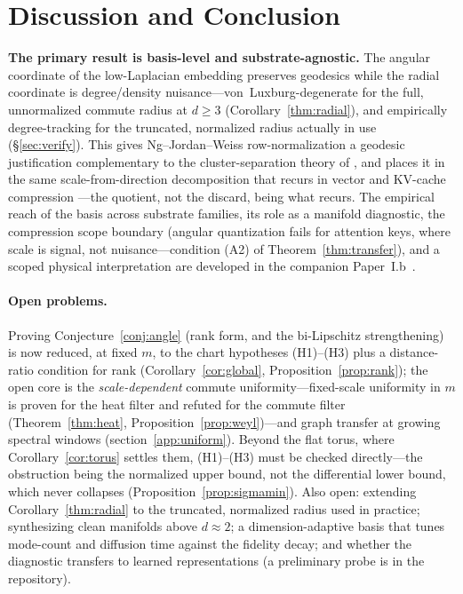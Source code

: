\documentclass[review]{siamart220329}
\begin{document}
\section{Discussion and Conclusion}\label{sec:disc}
\textbf{The primary result is basis-level and substrate-agnostic.} The angular
coordinate of the low-Laplacian embedding preserves geodesics while the radial
coordinate is degree/density nuisance---von~Luxburg-degenerate for the full,
unnormalized commute radius at $d\ge3$ (Corollary~\ref{thm:radial}), and
empirically degree-tracking for the truncated, normalized radius actually in use
(\S\ref{sec:verify}). This gives Ng--Jordan--Weiss
row-normalization a geodesic justification complementary to the cluster-separation
theory of \cite{schiebinger2015}, and places it in the same scale-from-direction
decomposition that recurs in vector and KV-cache compression \cite{polarquant2025}
---the quotient, not the discard, being what recurs. The empirical reach of the
basis across substrate families, its role as a manifold diagnostic, the compression
scope boundary (angular quantization fails for attention keys, where scale is
signal, not nuisance---condition (A2) of Theorem~\ref{thm:transfer}), and a scoped
physical interpretation are developed in the companion Paper~I.b~\cite{paperIb}.

\paragraph{Open problems.} Proving Conjecture~\ref{conj:angle} (rank form, and the
bi-Lipschitz strengthening) is now reduced, at fixed $m$, to the chart hypotheses
(H1)--(H3) plus a distance-ratio condition for rank (Corollary~\ref{cor:global},
Proposition~\ref{prop:rank}); the open core is the \emph{scale-dependent} commute
uniformity---fixed-scale uniformity in $m$ is proven for the heat filter and
refuted for the commute filter (Theorem~\ref{thm:heat},
Proposition~\ref{prop:weyl})---and graph transfer at growing spectral windows
(section~\ref{app:uniform}). Beyond the flat torus, where
Corollary~\ref{cor:torus} settles them, (H1)--(H3) must be checked directly---the
obstruction being the normalized upper bound, not the differential lower bound,
which never collapses (Proposition~\ref{prop:sigmamin}). Also open: extending Corollary~\ref{thm:radial} to
the truncated, normalized radius used in practice; synthesizing clean manifolds
above $d\approx2$; a dimension-adaptive basis that tunes mode-count and diffusion
time against the fidelity decay; and whether the diagnostic transfers to learned
representations (a preliminary probe is in the repository).
\end{document}
